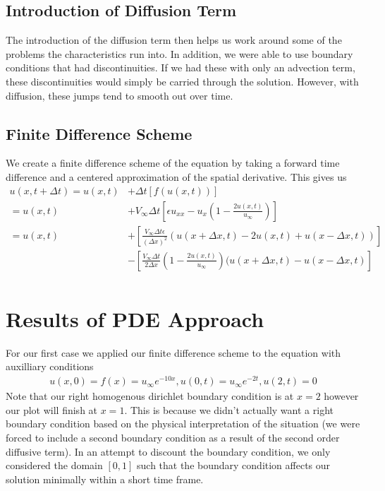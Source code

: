 \documentclass[12pt]{article}
\begin{document}
    
    \subsection{Introduction of Diffusion Term}
    The introduction of the diffusion term then helps us work around some of the problems the characteristics run into. In addition, we were able to use boundary conditions that had discontinuities. If we had these with only an advection term, these discontinuities would simply be carried through the solution. However, with diffusion, these jumps tend to smooth out over time.
    
    \subsection{Finite Difference Scheme}
    We create a finite difference scheme of the equation by taking a forward time difference and a centered approximation of the spatial derivative. This gives us
    \begin{align*}
        u(x,t+\Delta t)=u(x,t)&+\Delta t[f(u(x,t))] \\
        =u(x,t)&+V_{\infty}\Delta t\left[\epsilon u_{xx}-u_x\left(1-\frac{2u(x,t)}{u_{\infty}}\right)\right] \\
        =u(x,t)&+\left[\frac{V_{\infty}\Delta t\epsilon}{(\Delta x)^2}(u(x+\Delta x, t)-2u(x,t)+u(x-\Delta x,t))\right] \\
        &-\left[\frac{V_{\infty}\Delta t}{2\Delta x}\left(1-\frac{2u(x,t)}{u_{\infty}}\right)(u(x+\Delta x,t)-u(x-\Delta x,t)\right] \\
    \end{align*}
    
    \section{Results of PDE Approach}
    For our first case we applied our finite difference scheme to the equation with auxilliary conditions 
    \begin{align*}
        u(x, 0) = f(x) = u_\infty e^{-10x}, u(0, t) = u_\infty e^{-2t}, u(2, t) = 0
    \end{align*}
    Note that our right homogenous dirichlet boundary condition is at $x = 2$ however our plot will finish at $x = 1$. This is because we didn't actually want a right boundary condition based on the physical interpretation of the situation (we were forced to include a second boundary condition as a result of the second order diffusive term). In an attempt to discount the boundary condition, we only considered the domain $[0, 1]$ such that the boundary condition affects our solution minimally within a short time frame. 
    
\end{document}
